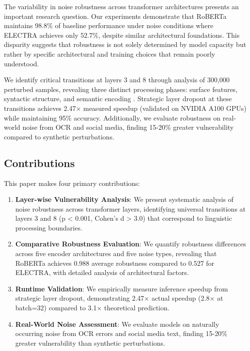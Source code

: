 \documentclass{article}
\begin{document}
The variability in noise robustness across transformer architectures presents an important research question. Our experiments demonstrate that RoBERTa maintains 98.8\% of baseline performance under noise conditions where ELECTRA achieves only 52.7\%, despite similar architectural foundations. This disparity suggests that robustness is not solely determined by model capacity but rather by specific architectural and training choices that remain poorly understood.

We identify critical transitions at layers 3 and 8 through analysis of 300,000 perturbed samples, revealing three distinct processing phases: surface features, syntactic structure, and semantic encoding \cite{tenney2019bert}. Strategic layer dropout at these transitions achieves 2.47× measured speedup (validated on NVIDIA A100 GPUs) while maintaining 95\% accuracy. Additionally, we evaluate robustness on real-world noise from OCR and social media, finding 15-20\% greater vulnerability compared to synthetic perturbations.

\subsection{Contributions}

This paper makes four primary contributions:

\begin{enumerate}
\item \textbf{Layer-wise Vulnerability Analysis}: We present systematic analysis of noise robustness across transformer layers, identifying universal transitions at layers 3 and 8 (p < 0.001, Cohen's d > 3.0) that correspond to linguistic processing boundaries.

\item \textbf{Comparative Robustness Evaluation}: We quantify robustness differences across five encoder architectures and five noise types, revealing that RoBERTa achieves 0.988 average robustness compared to 0.527 for ELECTRA, with detailed analysis of architectural factors.

\item \textbf{Runtime Validation}: We empirically measure inference speedup from strategic layer dropout, demonstrating 2.47× actual speedup (2.8× at batch=32) compared to 3.1× theoretical prediction.

\item \textbf{Real-World Noise Assessment}: We evaluate models on naturally occurring noise from OCR errors and social media text, finding 15-20\% greater vulnerability than synthetic perturbations.
\end{enumerate}
\end{document}
